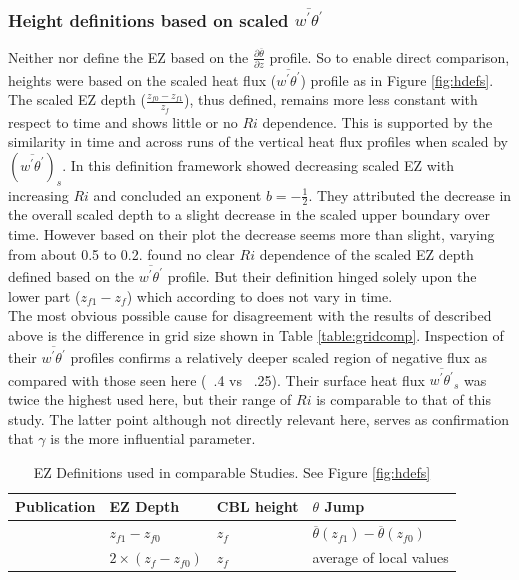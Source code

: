 \subsubsection{Height definitions based on scaled $\overline{w^{'}\theta^{'}}$}
Neither \cite{FedConzMir04} nor \cite{GarciaMellado} define the EZ based on the $\frac{\partial \overline{\theta}}{\partial z}$ profile.  So to enable direct comparison, heights were based on the scaled heat flux ($\overline{w^{'}\theta^{'}}$) profile as in Figure \ref{fig:hdefs}. The scaled EZ depth ($\frac{z_{f0}-z_{f1}}{z_{f}}$), thus defined, remains more less constant with respect to time and shows little or no $Ri$ dependence.  This is supported by the similarity in time and across runs of the vertical heat flux profiles when scaled by $(\overline{w^{'}\theta^{'}})_{s}$.  In this definition framework \cite{FedConzMir04} showed decreasing scaled EZ with increasing $Ri$ and concluded an exponent $b = -\frac{1}{2}$.  They attributed the decrease in the overall scaled depth to a slight decrease in the scaled upper boundary over time.  However based on their plot the decrease seems more than slight, varying from about 0.5 to 0.2.  \cite{BrooksFowler2} found no clear $Ri$ dependence of the scaled EZ depth defined based on the $\overline{w^{'}\theta^{'}}$ profile.  But their definition hinged solely upon the lower part ($z_{f1} - z_{f}$) which according to \cite{FedConzMir04} does not vary in time.\\

The most obvious possible cause for disagreement with the results of \cite{FedConzMir04} described above is the difference in grid size shown in Table \ref{table:gridcomp}.  Inspection of their $\overline{w^{'}\theta^{'}}$ profiles confirms a relatively deeper scaled region of negative flux as compared with those seen here (~.4 vs ~.25). Their surface heat flux $\overline{w^{'}\theta^{'}}_{s}$ was twice the highest used here, but their range of $Ri$ is comparable to that of this study.  The latter point although not directly relevant here, serves as confirmation that $\gamma$ is the more influential parameter.\\

  
\begin{table}[htbp]
\label{table:elandri}
\caption[EZ Definitions used in comparable Studies]{EZ Definitions used in comparable Studies.  See Figure \ref{fig:hdefs}}

\begin{tabular}{ p{3.9cm} p{} p{} p{3cm}}
   

Publication & EZ Depth & CBL height & $\theta$ Jump\\ \hline
\cite{FedConzMir04} & $z_{f1} - z_{f0}$ & $z_{f}$ &  $\overline{\theta}(z_{f1})-\overline{\theta}(z_{f0})$\\ %
\cite{BrooksFowler2} & $2 \times (z_{f} - z_{f0})$ & $z_{f}$ & average of local values\\ \hline

\end{tabular}
    
\end{table}


